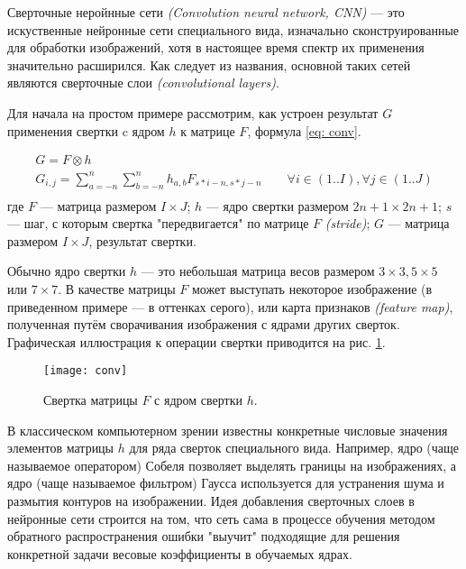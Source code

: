 \indent
\indent
Сверточные неройнные сети \textit{(Convolution neural network, CNN)} --- 
это искуственные нейронные сети специального вида,
изначально сконструированные для 
обработки изображений, хотя в настоящее время спектр их применения 
значительно расширился. Как следует из названия, основной таких сетей 
являются сверточные слои \textit{(convolutional layers)}.

\indent
\indent
 Для начала на простом примере рассмотрим,
 как устроен результат $G$ применения свертки c ядром $h$ 
 к матрице  $F$, формула \ref{eq: conv}. 

\begin{equation}\label{eq: conv}
    \begin{gathered}
        G = F \otimes h \\
	    G_{i, j} = \sum_{a=-n}^{n} \sum_{b=-n}^{n} h_{a, b} F_{s*i - n, s*j - n} \qquad
	    \forall i \in (1..I), \forall j \in (1..J) \\
    \end{gathered}
\end{equation}
где $F$ --- матрица размером $I \times J$;
$h$ --- ядро свертки размером $2n+1 \times 2n+1$;
$s$ --- шаг, с которым свертка "передвигается" по матрице $F$ \textit{(stride)};
$G$ --- матрица размером $I \times J$, результат свертки.

\indent
\indent
Обычно ядро свертки $h$ --- это небольшая матрица весов размером
 $3\times3, 5\times5$ или $7\times7$. В качестве матрицы $F$ может выступать
 некоторое изображение (в приведенном примере --- в оттенках серого),
  или карта признаков \textit{(feature map)}, полученная 
путём сворачивания изображения с ядрами других сверток.
Графическая иллюстрация
к операции свертки приводится на рис. \ref{tikzpicture: conv}.


\begin{figure}[h!]
    \begin{center}
   	    \texttt{[image: conv]}
   	\end{center}
   	\caption{Свертка матрицы $F$ с ядром свертки $h$.}
   	\label{tikzpicture: conv}
\end{figure}


\indent
\indent
В классическом компьютерном зрении известны конкретные числовые
значения элементов матрицы $h$ для ряда сверток 
специального вида. Например, ядро (чаще называемое оператором) Собеля 
позволяет выделять границы на изображениях, а ядро (чаще
называемое фильтром) Гаусса используется для устранения шума
и размытия контуров на изображении. Идея добавления сверточных слоев в 
 нейронные сети строится на том, что сеть сама в процессе
обучения методом обратного распространения ошибки "выучит" подходящие
для решения конкретной задачи весовые коэффициенты в обучаемых ядрах.


